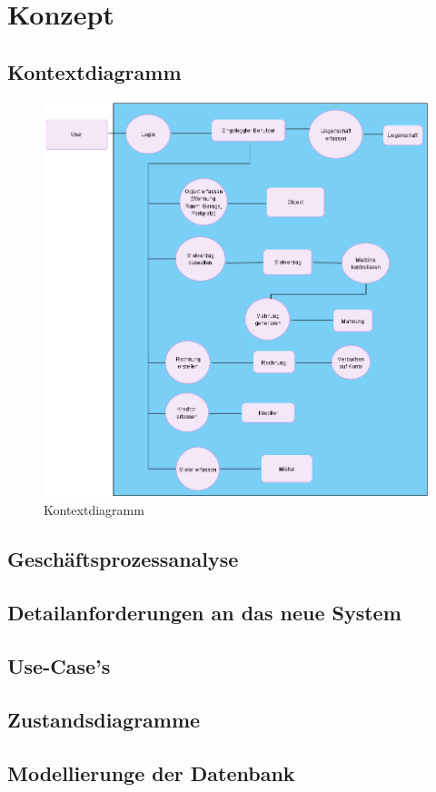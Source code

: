\section{Konzept}

\subsection{Kontextdiagramm}
\begin{figure}[H]
  \begin{center}
    \includegraphics[width=0.5\linewidth]{content/diagrams/out/contextdiagram/context.png}
    \caption{Kontextdiagramm}
  \end{center}
  \label{contextdiag}
\end{figure}

\subsection{Geschäftsprozessanalyse}


\subsection{Detailanforderungen an das neue System}

\subsection{Use-Case's}


\subsection{Zustandsdiagramme}
\subsection{Modellierunge der Datenbank}
